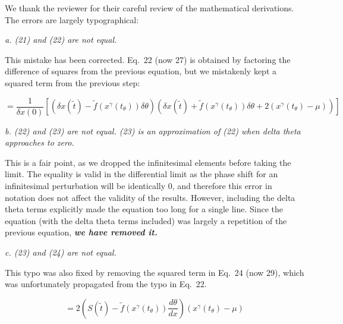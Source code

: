 \documentclass[11pt, letterpaper]{article}
\newenvironment{reviewer}{\itshape\color{gray}}{}
\newenvironment{manuscript}[1]{\begin{center}\begin{tcolorbox}[colback=green!5!white,colframe=green!75!black,width=0.8\textwidth,title={#1},breakable,fonttitle=\bfseries]}{\end{tcolorbox}\end{center}}
\begin{document}
We thank the reviewer for their careful review of the mathematical derivations. The errors are largely typographical:

\begin{reviewer}
a. (21) and (22) are not equal. 
\end{reviewer}

This mistake has been corrected.
Eq.~22 (now 27) is obtained by factoring the difference of squares from the previous equation, but we mistakenly kept a squared term from the previous step:

\begin{manuscript}{Page 10}
  \begin{equation}
  = \frac{1}{\delta x(0)} \left[\left(\delta x(\tilde{t}) -
    \tilde{f}\left(x^\gamma(t_\theta)\right)\delta\theta\right) \left(\delta
    x(\tilde{t}) + \tilde{f}\left(x^\gamma(t_\theta)\right)\delta\theta +
    2(x^\gamma(t_\theta) - \mu)\right) \right]
    \tag{27}
  \end{equation}
\end{manuscript}

\begin{reviewer}
b. (22) and (23) are not equal. (23) is an approximation of (22) when delta theta approaches to zero. 
\end{reviewer}

This is a fair point, as we dropped the infinitesimal elements before taking the limit.
The equality is valid in the differential limit as the phase shift for an infinitesimal perturbation will be identically 0, and therefore this error in notation does not affect the validity of the results.
However, including the delta theta terms explicitly made the equation too long for a single line.
Since the equation (with the delta theta terms included) was largely a repetition of the previous equation, {\bfseries\itshape we have removed it.}

\begin{reviewer}
c. (23) and (24) are not equal.
\end{reviewer}

This typo was also fixed by removing the squared term in Eq.~24 (now 29), which was unfortunately propagated from the typo in Eq.~22.

\begin{manuscript}{page 10}
  \begin{equation}
  = 2\left(S(\tilde{t}) - \tilde{f}(x^\gamma(t_\theta))\frac{d\theta}{dx}\right)\left(x^\gamma(t_\theta) - \mu\right)
    \tag{29}
  \end{equation}
\end{manuscript}
\end{document}
